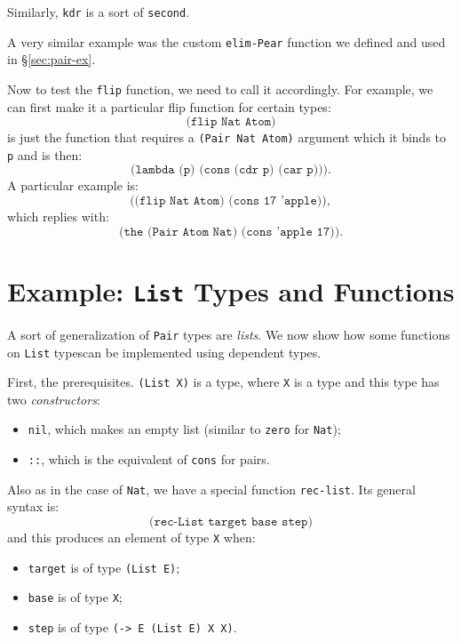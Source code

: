 Similarly, \texttt{kdr} is a sort of \texttt{second}.

A very similar example was the custom \texttt{elim-Pear} function we defined
and used in \S\ref{sec:pair-ex}.

Now to test the \texttt{flip} function, we need to call it accordingly.
For example, we can first make it a particular flip function for certain
types:
\[
  \texttt{(flip Nat Atom)}
\]
is just the function that requires a \texttt{(Pair Nat Atom)} argument
which it binds to \texttt{p} and is then:
\[
  \texttt{(lambda (p) (cons (cdr p) (car p)))}.
\]
A particular example is:
\[
  \texttt{((flip Nat Atom) (cons 17 'apple))},
\]
which replies with:
\[
  \texttt{(the (Pair Atom Nat) (cons 'apple 17))}.
\]

\section{Example: \texttt{List} Types and Functions}
\label{sec:inductive-ex}

A sort of generalization of \texttt{Pair} types are \emph{lists}.
We now show how some functions on \texttt{List} types\footnotemark can
be implemented using dependent types.

First, the prerequisites. \texttt{(List X)} is a type, where \texttt{X}
is a type and this type has two \emph{constructors}:
\begin{itemize}
\item \texttt{nil}, which makes an empty list (similar to \texttt{zero}
  for \texttt{Nat});
\item \texttt{::}, which is the equivalent of \texttt{cons} for pairs.
\end{itemize}

Also as in the case of \texttt{Nat}, we have a special 
function \texttt{rec-list}. Its general syntax is:
\[
  \texttt{(rec-List target base step)}
\]
and this produces an element of type \texttt{X} when:
\begin{itemize}
\item \texttt{target} is of type \texttt{(List E)};
\item \texttt{base} is of type \texttt{X};
\item \texttt{step} is of type \texttt{(-> E (List E) X X)}.
\end{itemize}


